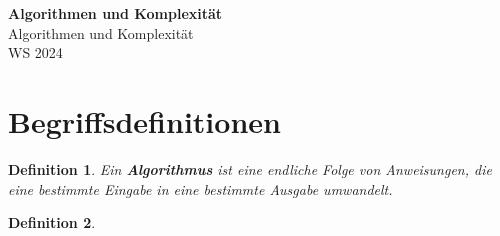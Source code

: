 \documentclass[11pt]{article}
\begin{document}
\thispagestyle{empty}

\newtheorem{anmk}{Anmerkung}[section]
\newtheorem{bsp}{Beispiel}[section]
\newtheorem{definition}{Definition}[section]

\renewcommand{\figurename}{Fig.}

\newcommand{\ol}[1]{\begin{enumerate}#1\end{enumerate}}
\newcommand{\ul}[1]{\begin{itemize}#1\end{itemize}}
\newcommand{\li}[1]{\item{#1}}
\newcommand{\equivto}{\Longleftrightarrow}
\newcommand{\sube}{\subseteq}

\newcommand{\N}{\mathbb{N}}
\newcommand{\Z}{\mathbb{Z}}
\newcommand{\R}{\mathbb{R}}

\begin{center}
  {\LARGE \bf Algorithmen und Komplexität}\\
  {\Large Algorithmen und Komplexität}\\
  WS 2024
\end{center}

\section{Begriffsdefinitionen}
\begin{definition}
  Ein \textbf{Algorithmus} ist eine endliche Folge von Anweisungen, die eine bestimmte Eingabe in eine bestimmte Ausgabe
  umwandelt.
\end{definition}
\begin{definition}
  
\end{definition}
\end{document}
